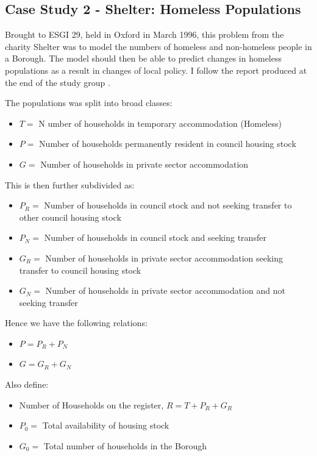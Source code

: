 \documentclass[11pt]{article} %
\begin{document}
	
	
	\subsection{Case Study 2 - Shelter: Homeless Populations \label{homeless}}
	

   Brought to ESGI 29, held in Oxford in March 1996, this problem from the charity Shelter  was to model the numbers of homeless and non-homeless people in a Borough. The model should then be able to predict changes in homeless populations as a result in changes of local policy. I follow the report produced at the end of the study group \cite{Shelter1996}.
	
	The populations was split into broad classes: 
	\begin{itemize}
		\item $ T= $ N umber of households in temporary accommodation (Homeless)
		\item $  P= $ Number of households permanently resident in council housing stock
		\item $ G= $ Number of households in private sector accommodation 
	\end{itemize}
	This is then further subdivided as:
	\begin{itemize}
		\item $ P_R= $ Number of households in council stock and not  seeking transfer to other council housing stock 
		\item $ P_N= $ Number of households in council stock and seeking transfer 
		\item $ G_R= $ Number of households in private sector accommodation seeking transfer to council housing stock 
		\item $ G_N= $ Number of households in private sector accommodation and not seeking transfer
	\end{itemize}

Hence we have the following relations:
\begin{itemize}
	\item $ P=P_R+P_N $
	\item $ G=G_R+G_N $
	
\end{itemize}

Also define: 
\begin{itemize}
	\item Number of Households on the register,  $  R=T+P_R+G_R $
	\item $ P_0 = $ Total availability of housing stock 
	\item $ G_0= $ Total number of households in the Borough
\end{itemize}
\end{document}
